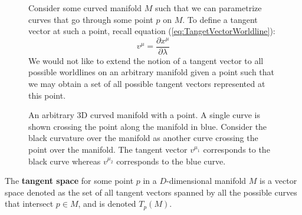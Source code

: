 \documentclass{article}
\begin{document}
 	\pagebreak
 		\begin{figure}[th]
 			\begin{minipage}{0.4\textwidth}
 				\center
 				\caption{An arbitrary 3D curved manifold with a point. A single curve is shown crossing the point along the manifold in blue. Consider the black curvature over the manifold as another curve crossing the point over the manifold. The tangent vector $v^{\mu_1}$ corresponds to the black curve whereas $v^{\mu_2}$ corresponds to the blue curve.}
 			\end{minipage}
 			\hfill
 			\begin{minipage}{0.56\textwidth}
 				\begin{spacing}{1.5}
 					Consider some curved manifold $M$ such that we can parametrize curves that go through some point $p$ on $M$. To define a tangent vector at such a point, recall equation (\ref{eq:TangetVectorWorldline}):
 					$$ v^\mu = \frac{\partial x^\mu}{\partial \lambda}$$
 					We would not like to extend the notion of a tangent vector to all possible worldlines on an arbitrary manifold given a point such that we may obtain a set of all possible tangent vectors represented at this point.
 				\end{spacing}
 			\end{minipage}
 		\end{figure}
 		\vspace{-1cm}
 		\begin{defn}
 			The \textbf{tangent space} for some point $p$ in a $D$-dimensional manifold $M$ is a vector space denoted as the set of all tangent vectors spanned by all the possible curves that intersect $p \in M$, and is denoted $T_p (M)$.
 		\end{defn}
\end{document}

